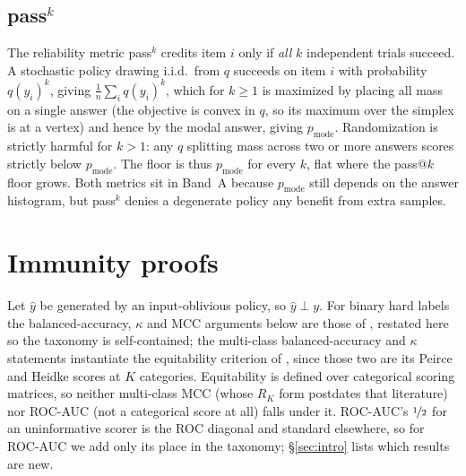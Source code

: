 \documentclass{article}
\theoremstyle{plain}
\theoremstyle{definition}
\begin{document}
\subsection{\texorpdfstring{pass$^{k}$}{pass\^{}k}}
\label{app:passhatk}
The reliability metric pass$^{k}$ credits item $i$ only if \emph{all} $k$ independent trials succeed. A stochastic policy drawing i.i.d.\ from $q$ succeeds on item $i$ with probability $q(y_i)^k$, giving $\frac{1}{n}\sum_i q(y_i)^k$, which for $k \ge 1$ is maximized by placing all mass on a single answer (the objective is convex in $q$, so its maximum over the simplex is at a vertex) and hence by the modal answer, giving $p_{\mathrm{mode}}$. Randomization is strictly harmful for $k > 1$: any $q$ splitting mass across two or more answers scores strictly below $p_{\mathrm{mode}}$. The floor is thus $p_{\mathrm{mode}}$ for every $k$, flat where the pass@$k$ floor grows. Both metrics sit in Band~A because $p_{\mathrm{mode}}$ still depends on the answer histogram, but pass$^{k}$ denies a degenerate policy any benefit from extra samples.

\section{Immunity proofs}
\label{app:immune}

Let $\hat{y}$ be generated by an input-oblivious policy, so $\hat{y} \perp y$. For binary hard labels the balanced-accuracy, $\kappa$ and MCC arguments below are those of \citet{vandebijl2022dutchdraw}, restated here so the taxonomy is self-contained; the multi-class balanced-accuracy and $\kappa$ statements instantiate the equitability criterion of \citet{gandin1992equitable}, since those two are its Peirce and Heidke scores at $K$ categories. Equitability is defined over categorical scoring matrices, so neither multi-class MCC (whose $R_K$ form postdates that literature) nor ROC-AUC (not a categorical score at all) falls under it. ROC-AUC's $\nicefrac{1}{2}$ for an uninformative scorer is the ROC diagonal and standard elsewhere, so for ROC-AUC we add only its place in the taxonomy; \S\ref{sec:intro} lists which results are new.
\end{document}
